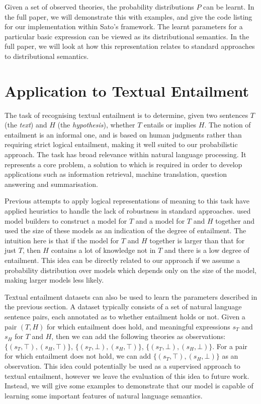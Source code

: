 \documentclass[letterpaper]{article}
\newcommand{\citet}[1]{\citeauthor{#1} \shortcite{#1}}
\begin{document}
Given a set of observed theories, the probability distributions $P$
can be learnt. In the full paper, we will demonstrate this with
examples, and give the code listing for our implementation within
Sato's framework. The learnt parameters for a particular basic
expression can be viewed as its distributional semantics. In the full
paper, we will look at how this representation relates to standard
approaches to distributional semantics.

\section{Application to Textual Entailment}

The task of recognising textual entailment \cite{Dagan:05} is to
determine, given two sentences $T$ (the \emph{text}) and $H$ (the
\emph{hypothesis}), whether $T$ entails or implies $H$. The notion of
entailment is an informal one, and is based on human judgments rather
than requiring strict logical entailment, making it well suited to our
probabilistic approach. The task has broad relevance within natural language processing. 
It represents a core problem, a solution to which is required in order to develop applications such as
information retrieval, machine translation, question answering and
summarisation.

Previous attempts to apply logical representations of meaning to this
task have applied heuristics to handle the lack of robustness in
standard approaches. \citet{Bos:06} used model builders to construct a
model for $T$ and a model for $T$ and $H$ together and used the size
of these models as an indication of the degree of entailment. The
intuition here is that if the model for $T$ and $H$ together is larger
than that for just $T$, then $H$ contains a lot of knowledge not in
$T$ and there is a low degree of entailment.  This idea can be
directly related to our approach if we assume a probability
distribution over models which depends only on the size of the model,
making larger models less likely.

Textual entailment datasets can also be used to learn the parameters
described in the previous section. A dataset typically consists of a
set of natural language sentence pairs, each annotated as to whether
entailment holds or not. Given a pair $(T,H)$ for which entailment
does hold, and meaningful expressions $s_T$ and $s_H$ for $T$ and $H$,
then we can add the following theories as observations:
$\{(s_T,\top),(s_H,\top)\}$, $\{(s_T,\bot),(s_H,\top)\}$,
$\{(s_T,\bot),(s_H,\bot)\}$. For a pair for which entailment does not
hold, we can add $\{(s_T,\top),(s_H,\bot)\}$ as an observation. This
idea could potentially be used as a supervised approach to textual
entailment, however we leave the evaluation of this idea to future
work. Instead, we will give some examples to demonstrate that our
model is capable of learning some important features of natural
language semantics.
\end{document}
